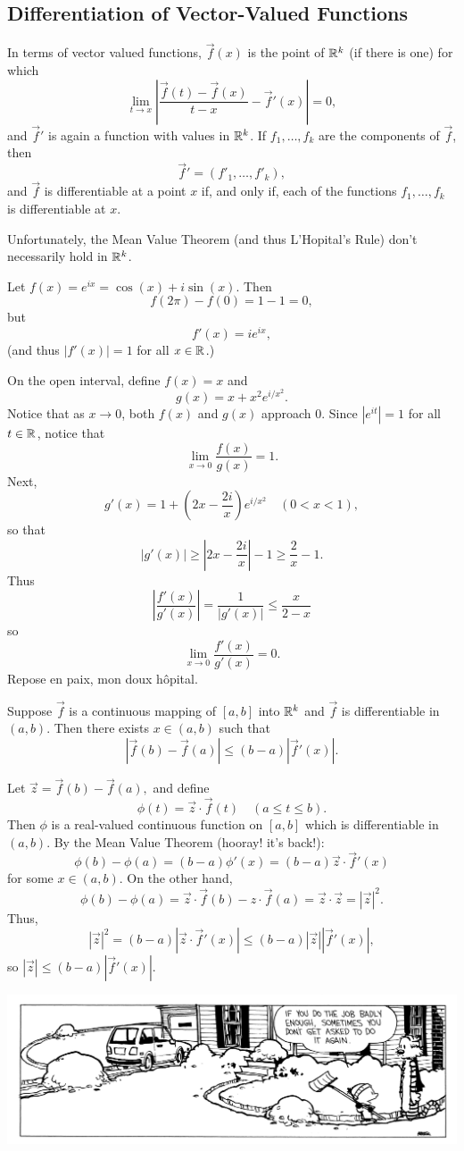 \documentclass{article}
\begin{document}
\subsection{Differentiation of Vector-Valued Functions}
\begin{remark}
    In terms of vector valued functions, $\vec{f}(x)$ is the point of $\mathbb R^{k}$ (if there is one) for which
    \[\lim_{t\rightarrow x}\left|\frac{\vec{f}(t)-\vec{f}(x)}{t-x}-\vec{f}'(x)\right|=0,\]and $\vec{f}'$ is again a function with values in $\mathbb R^{k}$. If $f_{1},\dotsc,f_{k}$ are the components of $\vec{f}$, then \[\vec{f}' = (f'_{1},\dotsc,f'_{k}),\]and $\vec{f}$ is differentiable at a point $x$ if, and only if, each of the functions $f_{1},\dotsc,f_{k}$ is differentiable at $x$.
\end{remark}
Unfortunately, the Mean Value Theorem (and thus L'Hopital's Rule) don't necessarily hold in $\mathbb R^{k}$.
\begin{example}
    Let $f(x)=e^{ix}=\cos(x)+i\sin(x).$ Then \[f(2\pi)-f(0)=1-1=0,\]but \[f'(x)=ie^{ix},\](and thus $|f'(x)|=1$ for all $x\in\mathbb R$.)
\end{example}
\begin{example}
    On the open interval, define $f(x)=x$ and \[g(x)=x+x^{2}e^{i/x^{2}}.\]Notice that as $x\rightarrow 0$, both $f(x)$ and $g(x)$ approach 0. Since $|e^{it}|=1$ for all $t\in\mathbb R$, notice that
    \[\lim_{x\rightarrow0}\frac{f(x)}{g(x)}=1.\]
    Next, \[g'(x)=1+\left(2x-\frac{2i}{x}\right)e^{i/x^{2}}\quad(0<x<1),\]so that \[|g'(x)|\geq\left|2x-\frac{2i}{x}\right|-1\geq \frac{2}{x}-1.\]Thus \[\left|\frac{f'(x)}{g'(x)}\right|=\frac{1}{|g'(x)|}\leq\frac{x}{2-x}\]so\[\lim_{x\rightarrow0}\frac{f'(x)}{g'(x)}=0.\]
    Repose en paix, mon doux hôpital.
\end{example}
\begin{theorem}
    Suppose $\vec{f}$ is a continuous mapping of $[a,b]$ into $\mathbb R^{k}$ and $\vec{f}$ is differentiable in $(a,b)$. Then there exists $x\in(a,b)$ such that \[|\vec{f}(b)-\vec{f}(a)|\leq(b-a)|\vec{f}'(x)|.\]
\end{theorem}
\begin{remark}
    Let $\vec{z}=\vec{f}(b)-\vec{f}(a),$ and define 
    \[\phi(t)=\vec{z}\cdot \vec{f}(t)\quad(a\leq t\leq b).\]Then $\phi$ is a real-valued continuous function on $[a,b]$ which is differentiable in $(a,b)$. By the Mean Value Theorem (hooray! it's back!):
    \[\phi(b)-\phi(a)=(b-a)\phi'(x)=(b-a)\vec{z}\cdot\vec{f}'(x)\]for some $x\in(a,b)$. On the other hand, 
    \[\phi(b)-\phi(a)=\vec{z}\cdot\vec{f}(b)-z\cdot\vec{f}(a)=\vec{z}\cdot\vec{z}=|\vec{z}|^{2}.\]Thus,
    \[|\vec{z}|^{2}=(b-a)|\vec{z}\cdot\vec{f}'(x)|\leq(b-a)|\vec{z}||\vec{f}'(x)|,\]so $|\vec{z}|\leq(b-a)|\vec{f}'(x)|$. 
\end{remark}
\newpage
\begin{center}
    \includegraphics[scale=.1]{cah.jpg}\\[2cm]
\end{center}
\end{document}
